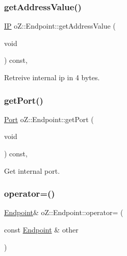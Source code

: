 \subsubsection{\texorpdfstring{getAddressValue()}{getAddressValue()}}
{\footnotesize\ttfamily \mbox{\hyperlink{namespaceo_z_ace55c2d0182a14ceea9649d0d0cf9c4a}{IP}} o\+Z\+::\+Endpoint\+::get\+Address\+Value (\begin{DoxyParamCaption}\item[{void}]{ }\end{DoxyParamCaption}) const\hspace{0.3cm}{\ttfamily [inline]}, {\ttfamily [noexcept]}}



Retreive internal ip in 4 bytes. 

\mbox{\label{classo_z_1_1_endpoint_aad983948594b295187d6117f99b1988d}} 
\subsubsection{\texorpdfstring{getPort()}{getPort()}}
{\footnotesize\ttfamily \mbox{\hyperlink{namespaceo_z_afeccb82d451972ba3b7d2a32b066b30b}{Port}} o\+Z\+::\+Endpoint\+::get\+Port (\begin{DoxyParamCaption}\item[{void}]{ }\end{DoxyParamCaption}) const\hspace{0.3cm}{\ttfamily [inline]}, {\ttfamily [noexcept]}}



Get internal port. 

\mbox{\label{classo_z_1_1_endpoint_a196bf4aa01c286bc1cf949cd4b68a175}} 
\subsubsection{\texorpdfstring{operator=()}{operator=()}}
{\footnotesize\ttfamily \mbox{\hyperlink{classo_z_1_1_endpoint}{Endpoint}}\& o\+Z\+::\+Endpoint\+::operator= (\begin{DoxyParamCaption}\item[{const \mbox{\hyperlink{classo_z_1_1_endpoint}{Endpoint}} \&}]{other }\end{DoxyParamCaption})\hspace{0.3cm}{\ttfamily [default]}}



